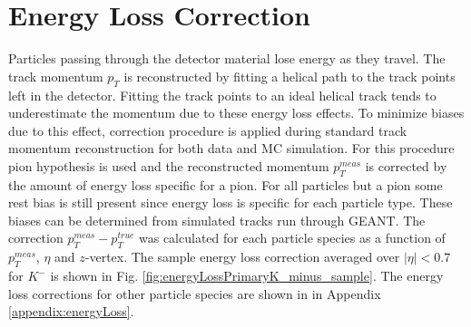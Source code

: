 

\chapter{Energy Loss Correction}\label{chap:energyLossCorrection}
Particles passing through the detector material lose energy as they travel. The track momentum $p_T$ is reconstructed by fitting a helical path to the track points left in the detector. Fitting the track points to an ideal
helical track tends to underestimate the momentum due to these energy loss effects. To minimize biases due to this effect, correction procedure is applied 
during standard track momentum reconstruction  for both data and MC simulation. For this procedure pion hypothesis is used  and the reconstructed momentum $p_T^{meas}$ is corrected by the amount of energy loss specific for a pion.  For all particles but a pion some rest bias  is still present since  energy loss is specific for each particle type. These biases  can be determined from simulated tracks run through GEANT.
The correction $p_T^{meas}-p_T^{true}$ was calculated for each particle species as a function of $p_T^{meas}$, $\eta$ and $z$-vertex. The sample energy loss correction averaged over $|\eta|<0.7$ for $K^-$ is shown in Fig. \ref{fig:energyLossPrimaryK_minus_sample}. 
\noindent The energy loss corrections for other particle species are shown in  in Appendix \ref{appendix:energyLoss}.\newline



